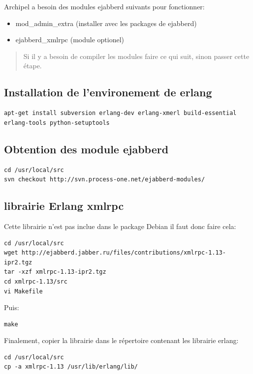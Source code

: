 Archipel a besoin des modules ejabberd suivants pour fonctionner:

\begin{itemize}
\item mod\_admin\_extra (installer avec les packages de ejabberd)
\item ejabberd\_xmlrpc (module optionel)
\end{itemize} 
 
\begin{quotation}
Si il y a besoin de compiler les modules faire ce qui suit, sinon passer cette étape.
\end{quotation}

\subsection{Installation de l'environement de erlang}
\begin{lstlisting}
apt-get install subversion erlang-dev erlang-xmerl build-essential erlang-tools python-setuptools
\end{lstlisting}

\subsection{Obtention des module ejabberd}
\begin{lstlisting}
cd /usr/local/src
svn checkout http://svn.process-one.net/ejabberd-modules/
\end{lstlisting}

\subsection{librairie Erlang xmlrpc}
Cette librairie n'est pas inclue dans le package Debian il faut donc faire cela:
\begin{lstlisting}
cd /usr/local/src
wget http://ejabberd.jabber.ru/files/contributions/xmlrpc-1.13-ipr2.tgz
tar -xzf xmlrpc-1.13-ipr2.tgz
cd xmlrpc-1.13/src
vi Makefile
\end{lstlisting}

Puis:
\begin{lstlisting}
make
\end{lstlisting}

Finalement, copier la librairie dans le répertoire contenant les librairie erlang:
\begin{lstlisting}
cd /usr/local/src
cp -a xmlrpc-1.13 /usr/lib/erlang/lib/
\end{lstlisting}

